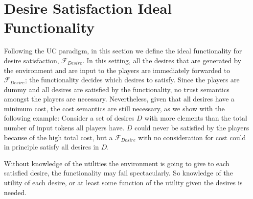 \section{Desire Satisfaction Ideal Functionality}
  Following the UC paradigm, in this section we define the ideal functionality for desire satisfaction, $\mathcal{F}_{Desire}$.
  In this setting, all the desires that are generated by the environment and are input to the players are immediately forwarded
  to $\mathcal{F}_{Desire}$; the functionality decides which desires to satisfy. Since the players are dummy and all desires
  are satisfied by the functionality, no trust semantics amongst the players are necessary. Nevertheless, given that all
  desires have a minimum cost, the cost semantics are still necessary, as we show with the following example: Consider a set of
  desires $D$ with more elements than the total number of input tokens all players have. $D$ could never be satisfied by the
  players because of the high total cost, but a $\mathcal{F}_{Desire}$ with no consideration for cost could in principle
  satisfy all desires in $D$. 

  Without knowledge of the utilities the environment is going to give to each satisfied desire, the functionality may fail
  spectacularly. So knowledge of the utility of each desire, or at least some function of the utility given the desires is
  needed.
